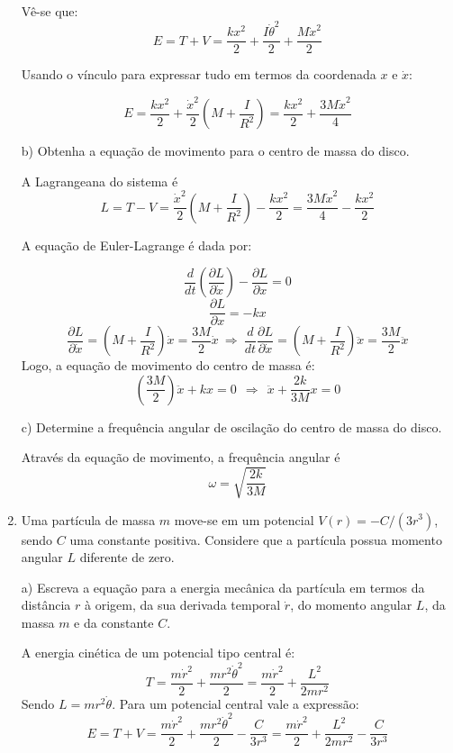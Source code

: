 \begin{enumerate}[start=1,label={\bfseries Q\arabic*.}]

Vê-se que:
$$
 E = T + V = \frac{kx^{2}}{2} + \frac{I \dot{\theta}^{2}}{2} + \frac{M \dot{x}^{2}}{2}
$$

Usando o vínculo para expressar tudo em termos da coordenada $x$ e $\dot{x}$:

$$
 E = \frac{kx^{2}}{2} + \frac{\dot{x}^{2}}{2} \left( M + \frac{I}{R^{2}}  \right) = \frac{kx^{2}}{2} + \frac{3M \dot{x}^{2}}{4}
$$




b) Obtenha a equação de movimento para o centro de massa do disco.

\resposta A Lagrangeana do sistema é
$$
 L = T - V =  \frac{\dot{x}^{2}}{2} \left( M + \frac{I}{R^{2}}  \right) - \frac{kx^{2}}{2} = \frac{3M \dot{x}^{2}}{4} - \frac{kx^{2}}{2}
$$

A equação de Euler-Lagrange é dada por:

$$
\frac{d}{dt} \left( \frac{\partial L}{\partial \dot{x}}  \right) - \frac{\partial L}{\partial x} = 0
$$
$$
\frac{\partial L}{\partial x} = -kx
$$
$$
\frac{\partial L}{\partial \dot{x}} = \left( M + \frac{I}{R^{2}}  \right) \dot{x} = \frac{3M}{2} \dot{x} \ \Rightarrow \ \frac{d}{dt} \frac{\partial L}{\partial \dot{x}} = \left( M + \frac{I}{R^{2}}  \right) \ddot{x} = \frac{3M}{2} \ddot{x}
$$
Logo, a equação de movimento do centro de massa é:
$$
\left( \frac{3M}{2}  \right) \ddot{x} + kx = 0 \ \ \Rightarrow \ \ \ddot{x} + \frac{2k}{3M} x = 0
$$


c) Determine a frequência angular de oscilação do centro de massa do disco.


\resposta Através da equação de movimento, a frequência angular é
$$
\omega = \sqrt{\frac{2k}{3M}}
$$


\item Uma partícula de massa $m$ move-se em um potencial $V(r) = -C/(3r^{3})$, sendo $C$ uma constante positiva. Considere que a partícula possua momento angular $L$ diferente de zero.

a) Escreva a equação para a energia mecânica da partícula em termos da distância $r$ à origem, da sua derivada temporal $\dot{r}$, do momento angular $L$, da massa $m$ e da constante $C$.

\resposta A energia cinética de um potencial tipo central é:
$$
T = \frac{m \dot{r}^{2}}{2} + \frac{m r^{2} \dot{\theta}^{2}}{2} = \frac{m \dot{r}^{2}}{2} + \frac{L^{2}}{2 m r^{2}}
$$
Sendo $L = mr^{2} \dot{\theta}$. Para um potencial central vale a expressão:
$$
E = T + V = \frac{m \dot{r}^{2}}{2} + \frac{m r^{2} \dot{\theta}^{2}}{2} - \frac{C}{3r^{3}} = \frac{m \dot{r}^{2}}{2} + \frac{L^{2}}{2 m r^{2}} - \frac{C}{3r^{3}}
$$



\end{enumerate}
